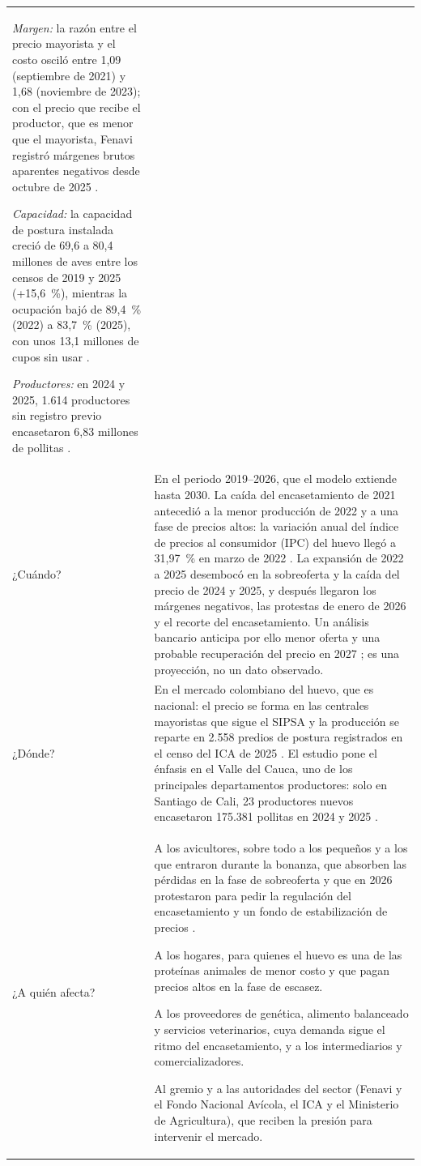 \documentclass[preprint,12pt,authoryear]{elsarticle}
\begin{document}
\begin{xltabular}{\textwidth}{@{}P{2.2cm}L@{}}
\textit{Margen:} la razón entre el precio mayorista y el costo osciló entre 1,09 (septiembre de 2021) y 1,68 (noviembre de 2023); con el precio que recibe el productor, que es menor que el mayorista, Fenavi registró márgenes brutos aparentes negativos desde octubre de 2025 \citep{Fenavi2026Fenaviquin440}.\par
\textit{Capacidad:} la capacidad de postura instalada creció de 69,6 a 80,4 millones de aves entre los censos de 2019 y 2025 (+15,6~\%), mientras la ocupación bajó de 89,4~\% (2022) a 83,7~\% (2025), con unos 13,1 millones de cupos sin usar \citep{ICA2025Censo}.\par
\textit{Productores:} en 2024 y 2025, 1.614 productores sin registro previo encasetaron 6,83 millones de pollitas \citep{Fenavi2026Fenaviquin440}. \\
\addlinespace
¿Cuándo? & En el periodo 2019--2026, que el modelo extiende hasta 2030. La caída del encasetamiento de 2021 antecedió a la menor producción de 2022 y a una fase de precios altos: la variación anual del índice de precios al consumidor (IPC) del huevo llegó a 31,97~\% en marzo de 2022 \citep{DANE2026IPC}. La expansión de 2022 a 2025 desembocó en la sobreoferta y la caída del precio de 2024 y 2025, y después llegaron los márgenes negativos, las protestas de enero de 2026 y el recorte del encasetamiento. Un análisis bancario anticipa por ello menor oferta y una probable recuperación del precio en 2027 \citep{Portafolio2026}; es una proyección, no un dato observado. \\
\addlinespace
¿Dónde? & En el mercado colombiano del huevo, que es nacional: el precio se forma en las centrales mayoristas que sigue el SIPSA \citep{DANE2026SIPSA} y la producción se reparte en 2.558 predios de postura registrados en el censo del ICA de 2025 \citep{ICA2025Censo}. El estudio pone el énfasis en el Valle del Cauca, uno de los principales departamentos productores: solo en Santiago de Cali, 23 productores nuevos encasetaron 175.381 pollitas en 2024 y 2025 \citep{Fenavi2026Fenaviquin440}. \\
\addlinespace
¿A quién afecta? & A los avicultores, sobre todo a los pequeños y a los que entraron durante la bonanza, que absorben las pérdidas en la fase de sobreoferta y que en 2026 protestaron para pedir la regulación del encasetamiento y un fondo de estabilización de precios \citep{Villamizar2026}.\par
A los hogares, para quienes el huevo es una de las proteínas animales de menor costo y que pagan precios altos en la fase de escasez.\par
A los proveedores de genética, alimento balanceado y servicios veterinarios, cuya demanda sigue el ritmo del encasetamiento, y a los intermediarios y comercializadores.\par
Al gremio y a las autoridades del sector (Fenavi y el Fondo Nacional Avícola, el ICA y el Ministerio de Agricultura), que reciben la presión para intervenir el mercado. \\
\end{xltabular}
\endgroup
\end{document}
